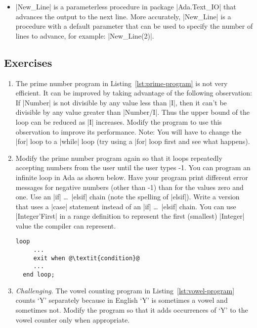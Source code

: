 \begin{itemize}
\item |New_Line| is a parameterless procedure in package |Ada.Text_IO| that advances the output
  to the next line. More accurately, |New_Line| is a procedure with a default parameter that can
  be used to specify the number of lines to advance, for example: |New_Line(2)|.
\end{itemize}

\subsection*{Exercises}

\begin{enumerate}
\item The prime number program in Listing~\ref{lst:prime-program} is not very efficient. It can
  be improved by taking advantage of the following observation: If |Number| is not divisible by
  any value less than |I|, then it can't be divisible by any value greater than |Number/I|. Thus
  the upper bound of the loop can be reduced as |I| increases. Modify the program to use this
  observation to improve its performance. Note: You will have to change the |for| loop to a
  |while| loop (try using a |for| loop first and see what happens).

\item Modify the prime number program again so that it loops repeatedly accepting numbers from
  the user until the user types -1. You can program an infinite loop in Ada as shown below. Have
  your program print different error messages for negative numbers (other than -1) than for the
  values zero and one. Use an |if| \ldots\ |elsif| chain (note the spelling of |elsif|). Write a
  version that uses a |case| statement instead of an |if| \ldots\ |elsif| chain. You can use
  |Integer'First| in a range definition to represent the first (smallest) |Integer| value the
  compiler can represent.

  \begin{lstlisting}[escapechar=\@]
  loop
     ...
     exit when @\textit{condition}@
     ...
  end loop;
  \end{lstlisting}

\item \textit{Challenging}. The vowel counting program in Listing~\ref{lst:vowel-program} counts
  `Y' separately because in English `Y' is sometimes a vowel and sometimes not. Modify the
  program so that it adds occurrences of `Y' to the vowel counter only when appropriate.
\end{enumerate}

